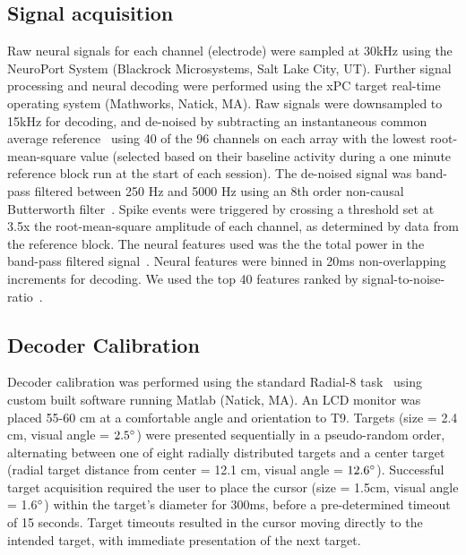 \subsection{Signal acquisition}

Raw neural signals for each channel (electrode) were sampled at 30kHz using the NeuroPort System (Blackrock Microsystems, Salt Lake City, UT). Further signal processing and neural decoding were performed using the xPC target real-time operating system (Mathworks, Natick, MA). Raw signals were downsampled to 15kHz for decoding, and de-noised by subtracting an instantaneous common average reference~\cite{Gil15, Jar15} using 40 of the 96 channels on each array with the lowest root-mean-square value (selected based on their baseline activity during a one minute reference block run at the start of each session). The de-noised signal was band-pass filtered between 250 Hz and 5000 Hz using an 8th order non-causal Butterworth filter~\cite{Mas15}. Spike events were triggered by crossing a threshold set at 3.5x the root-mean-square amplitude of each channel, as determined by data from the reference block. The neural features used was the the total power in the band-pass filtered signal~\cite{Jar15, Bra18}. Neural features were binned in 20ms non-overlapping increments for decoding. We used the top 40 features ranked by signal-to-noise-ratio~\cite{Mal15}. 

\subsection{Decoder Calibration}

Decoder calibration was performed using the standard Radial-8 task~\cite{Sim11, Gil15} using custom built software running Matlab (Natick, MA). An LCD monitor was placed 55-60 cm at a comfortable angle and orientation to T9. Targets (size = 2.4 cm, visual angle = $2.5\degree$) were presented sequentially in a pseudo-random order, alternating between one of eight radially distributed targets and a center target (radial target distance from center = 12.1 cm, visual angle = $12.6\degree$). Successful target acquisition required the user to place the cursor (size = 1.5cm, visual angle = 1.6$\degree$) within the target's diameter for 300ms, before a pre-determined timeout of 15 seconds. Target timeouts resulted in the cursor moving directly to the intended target, with immediate presentation of the next target.

